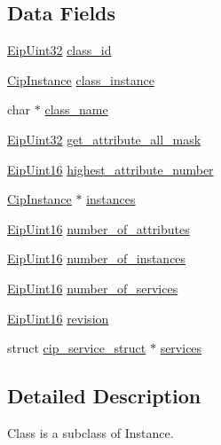 \subsection*{\-Data \-Fields}
\begin{DoxyCompactItemize}
\item 
\hyperlink{typedefs_8h_abf2dd49262551294eb990ef8746a2767}{\-Eip\-Uint32} \hyperlink{structcip__class_abd6eb84c5d2f1e74c2660bb5ebf6c64e}{class\-\_\-id}
\item 
\hyperlink{ciptypes_8h_aea7976be629e5ece275c993982186188}{\-Cip\-Instance} \hyperlink{structcip__class_ab9ed12190a1a0eb8de324736094f3d5a}{class\-\_\-instance}
\item 
char $\ast$ \hyperlink{structcip__class_a298e05ca692371f03674cbd5e3ba194c}{class\-\_\-name}
\item 
\hyperlink{typedefs_8h_abf2dd49262551294eb990ef8746a2767}{\-Eip\-Uint32} \hyperlink{structcip__class_a44da02745b5372357a164e0694c4d3fc}{get\-\_\-attribute\-\_\-all\-\_\-mask}
\item 
\hyperlink{typedefs_8h_ac1b4cfa25b4f5def62f23b455dd395d8}{\-Eip\-Uint16} \hyperlink{structcip__class_a13d9a94c9dbbab692255bb458661602c}{highest\-\_\-attribute\-\_\-number}
\item 
\hyperlink{ciptypes_8h_aea7976be629e5ece275c993982186188}{\-Cip\-Instance} $\ast$ \hyperlink{structcip__class_a4f6020c15afd9d9947a998a27edcf288}{instances}
\item 
\hyperlink{typedefs_8h_ac1b4cfa25b4f5def62f23b455dd395d8}{\-Eip\-Uint16} \hyperlink{structcip__class_aa4893264d371cf20b178deda0e616c58}{number\-\_\-of\-\_\-attributes}
\item 
\hyperlink{typedefs_8h_ac1b4cfa25b4f5def62f23b455dd395d8}{\-Eip\-Uint16} \hyperlink{structcip__class_a1f3c4ea3fd60256ae9dc48b14acf1ae3}{number\-\_\-of\-\_\-instances}
\item 
\hyperlink{typedefs_8h_ac1b4cfa25b4f5def62f23b455dd395d8}{\-Eip\-Uint16} \hyperlink{structcip__class_a4d33f12577046f545d90a1b8b764a885}{number\-\_\-of\-\_\-services}
\item 
\hyperlink{typedefs_8h_ac1b4cfa25b4f5def62f23b455dd395d8}{\-Eip\-Uint16} \hyperlink{structcip__class_a49d0ff69fc0f3f71c6061d0e5f483fe1}{revision}
\item 
struct \hyperlink{structcip__service__struct}{cip\-\_\-service\-\_\-struct} $\ast$ \hyperlink{structcip__class_a9871ebce8163c584f95d1a0c7f00e1f1}{services}
\end{DoxyCompactItemize}


\subsection{\-Detailed \-Description}
\-Class is a subclass of \-Instance. 

